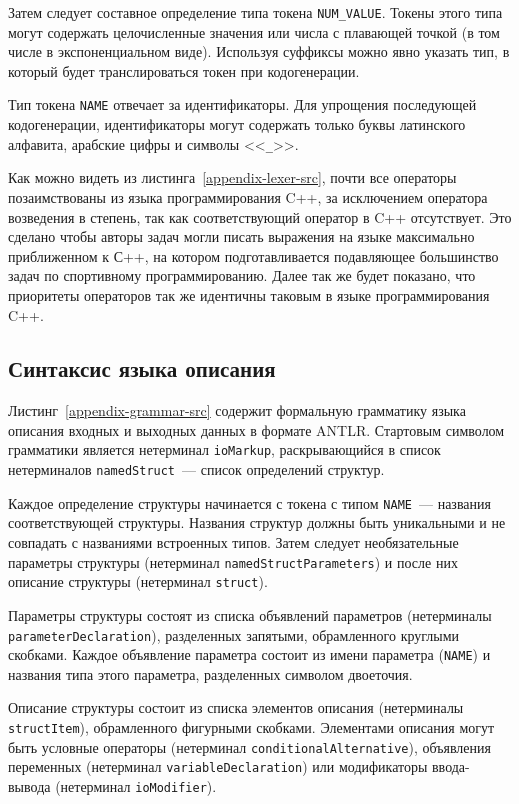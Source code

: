 \documentclass[times,specification,annotation]{style/itmo-student-thesis/itmo-student-thesis}
\begin{document}
Затем следует составное определение типа токена \texttt{NUM\_VALUE}. Токены этого типа могут содержать целочисленные значения или числа с плавающей точкой (в том числе в экспоненциальном виде). Используя суффиксы можно явно указать тип, в который будет транслироваться токен при кодогенерации.

Тип токена \texttt{NAME} отвечает за идентификаторы. Для упрощения последующей кодогенерации, идентификаторы могут содержать только буквы латинского алфавита, арабские цифры и символы <<\texttt{\_}>>.

Как можно видеть из листинга~\ref{appendix-lexer-src}, почти все операторы позаимствованы из языка программирования C++, за исключением оператора возведения в степень, так как соответствующий оператор в C++ отсутствует. Это сделано чтобы авторы задач могли писать выражения на языке максимально приближенном к С++, на котором подготавливается подавляющее большинство задач по спортивному программированию. Далее так же будет показано, что приоритеты операторов так же идентичны таковым в языке программирования C++.

\subsection{Синтаксис языка описания}

Листинг~\ref{appendix-grammar-src} содержит формальную грамматику языка описания входных и выходных данных в формате ANTLR. Стартовым символом грамматики является нетерминал \texttt{ioMarkup}, раскрывающийся в список нетерминалов \texttt{namedStruct}~--- список определений структур.

Каждое определение структуры начинается с токена с типом \texttt{NAME}~--- названия соответствующей структуры. Названия структур должны быть уникальными и не совпадать с названиями встроенных типов. Затем следует необязательные параметры структуры (нетерминал \texttt{namedStructParameters}) и после них описание структуры (нетерминал \texttt{struct}).

Параметры структуры состоят из списка объявлений параметров (нетерминалы \texttt{parameterDeclaration}), разделенных запятыми, обрамленного круглыми скобками. Каждое объявление параметра состоит из имени параметра (\texttt{NAME}) и названия типа этого параметра, разделенных символом двоеточия.

Описание структуры состоит из списка элементов описания (нетерминалы \texttt{structItem}), обрамленного фигурными скобками. Элементами описания могут быть условные операторы (нетерминал \texttt{conditionalAlternative}), объявления переменных (нетерминал \texttt{variableDeclaration}) или модификаторы ввода-вывода (нетерминал \texttt{ioModifier}).
\end{document}
